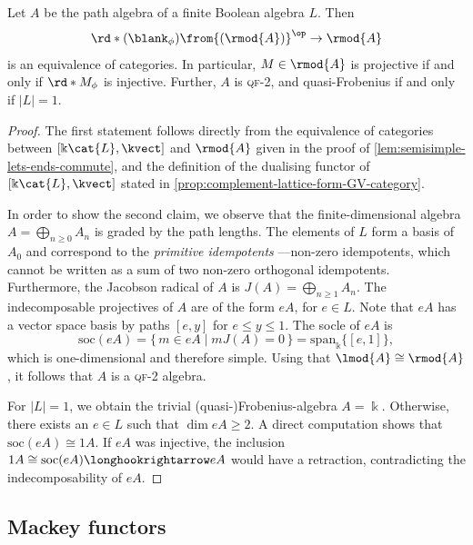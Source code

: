 \begin{proposition}\label{prop:qf2-algebras-from-boolean}
  Let \(A\) be the path algebra of a finite Boolean algebra \(L\).
  Then
  \[
    \rd*{( \blank_{\phi} )} \from {(\rmod{A})}^{\op} \to \rmod{A}
  \]
  is an equivalence of categories.
  In particular, \(M \in \rmod{A}\) is projective if and only if \(\rd*{M_{\phi}}\) is injective.
  Further, \(A\) is \textsc{qf}-2, and quasi\hyp{}Frobenius if and only if \(|L| = 1\).
\end{proposition}
\begin{proof}
  The first statement follows directly from the equivalence of categories between \([\Bbbk\cat{L}, \kvect]\) and \(\rmod{A}\)
  given in the proof of \cref{lem:semisimple-lets-ends-commute},
  and the definition of the dualising functor of \([\Bbbk\cat{L}, \kvect]\) stated in
  \cref{prop:complement-lattice-form-GV-category}.

  In order to show the second claim,
  we observe that the finite\hyp{}dimensional algebra \(A = \bigoplus_{n \geq 0} A_n\) is graded by the path lengths.
  The elements of \(L\) form a basis of \(A_0\) and correspond to the \emph{primitive idempotents}%
  —non-zero idempotents, which cannot be written as a sum of two non-zero orthogonal idempotents.
  Furthermore, the Jacobson radical of \(A\) is \(J(A) = \bigoplus_{n\geq 1} A_n\).
  The indecomposable projectives of \(A\) are of the form \(eA\), for \(e\in L\).
  Note that \(eA\) has a vector space basis by paths \([e,y]\) for \(e \leq y \leq 1\).
  The socle of \(eA\) is
  \[
    \mathrm{soc}(eA)
    = \{\,m \in eA \mid mJ(A)=0\,\}
    = \mathrm{span}_{\Bbbk}\{[e,1]\},
  \]
  which is one-dimensional and therefore simple.
  Using that \(\lmod{A} \cong \rmod{A}\), it follows that \(A\) is a \textsc{qf}-2 algebra.

  For \(|L|=1\), we obtain the trivial (quasi-)Frobenius-algebra \(A=\Bbbk\).
  Otherwise, there exists an \(e\in L\) such that \(\dim eA\geq 2\).
  A direct computation shows that \(\mathrm{soc}(eA)\cong 1 A\).
  If \(eA\) was injective,
  the inclusion \(1 A \cong \mathrm{soc}(eA) \longhookrightarrow eA\) would have a retraction,
  contradicting the indecomposability of \(eA\).
\end{proof}

\subsection{Mackey functors}\label{sec:mackey-functors}

